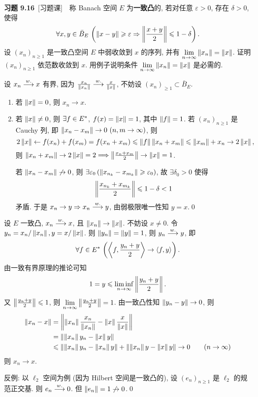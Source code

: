 	\textbf{习题 9.16}\ [习题课]\ \ 称 Banach 空间 $ E $ 为\textbf{一致凸}的, 若对任意 $ \varepsilon>0 $, 存在 $ \delta>0 $, 使得
	\[
		\forall x, y\in\bar{B}_{E}\,\left(\left\| x-y \right\|\geqslant\varepsilon\Rightarrow \left\| \frac{x+y}{2} \right\|\leqslant 1-\delta\right).
	\]
	设 $ (x_{n})_{n\geqslant1} $ 是一致凸空间 $ E $ 中弱收敛到 $ x $ 的序列, 并有 $ \lim\limits_{n\to\infty}\left\| x_{n} \right\|=\left\| x \right\| $. 证明 $ (x_{n})_{n\geqslant1} $ 依范数收敛到 $ x $. 用例子说明条件 $ \lim\limits_{n\to\infty}\left\| x_{n} \right\|=\left\| x \right\| $ 是必需的.
	\begin{Proof}
		设 $ x_{n}\overset{w.}{\longrightarrow} x $ 有界, 因为 $ \frac{x_{n}}{\left\| x_{n} \right\|}\overset{w.}{\longrightarrow}\frac{x}{\left\| x \right\|} $, 不妨设 $ (x_{n})_{\geqslant1}\subset\bar{B}_{E} $.
		\begin{enumerate}[(1)]
			\item 若 $ \left\| x \right\|=0 $, 则 $ x_{n}\to x $.
			\item 若 $ \left\| x \right\|\ne 0 $, 则 $ \exists f\in E^{*} $, $ f(x)=\left\| x \right\|=1 $, 其中 $ \left\| f \right\|=1 $. 若 $ (x_{n})_{n\geqslant1} $ 是 Cauchy 列, 即 $ \norm{x_{n}- x_{m}}\to 0\ (n, m\to\infty) $, 则
			\[
				2\left\| x \right\|\leftarrow f(x_{n})+f(x_{m})=f(x_{n}+x_{m})\leqslant\left\| f \right\|\left\| x_{n}+x_{m} \right\|\leqslant\left\| x_{m} \right\|+x_{n}\to 2\left\| x \right\|,
			\]
			则 $ \left\| x_{n}+x_{m} \right\|\to 2\left\| x \right\|=2\Longrightarrow \left\| \frac{x_{n}+x_{m}}{2} \right\|\to \left\| x \right\|=1 $.

			若 $ \left\| x_{n}-x_{m} \right\|\not\to 0 $, 则 $ \exists\varepsilon_{0}\,(\left\| x_{n_{k}}-x_{m_{k}} \right\|\geqslant\varepsilon_{0}) $, 故 $ \exists \delta_{0}>0 $ 使得
			\[
				\left\| \frac{x_{n_{k}}+x_{m_{k}}}{2} \right\|\leqslant1-\delta<1
			\]
			矛盾. 于是 $ x_{n}\to y\Rightarrow x_{n}\overset{w.}{\longrightarrow} y $, 由弱极限唯一性知 $ y=x $.\qed
		\end{enumerate}
	\end{Proof}
	\begin{Proof}[另证]
		设 $ E $ 一致凸, $ x_{n}\overset{w.}{\longrightarrow} x $, 且 $ \left\| x_{n} \right\|\to\left\| x \right\| $. 不妨设 $ x\ne 0 $. 令 $ y_{n}=x_{n}/\left\| x_{n} \right\|, y=x/\left\| x \right\| $. 则 $ \left\| y_{n} \right\|=\left\| y \right\|=1 $, 则 $ y_{n}\overset{w.}{\longrightarrow} y $, 即
		\[
			\forall f\in E^{*}\,\left( \left\langle f, \frac{y_{n}+y}{2} \right\rangle\to \left\langle f, y \right\rangle \right).
		\]
		由一致有界原理的推论可知
		\[
			1=y\leqslant\liminf_{n\to\infty}\left\| \frac{y_{n}+y}{2} \right\|.
		\]
		又 $ \left\| \frac{y_{n}+y}{2} \right\|\leqslant1 $, 则 $ \lim\limits_{n\to\infty}\left\| \frac{y_{n}+y}{2} \right\|=1 $. 由一致凸性知 $ \left\| y_{n}-y \right\|\to 0 $, 则
		\[
			\begin{aligned}
				\left\| x_{n}-x \right\| & = \left\| \left\| x_{n} \right\|\frac{x_{n}}{\left\| x_{n} \right\|}-\left\| x \right\|\frac{x}{\left\| x \right\|} \right\|\\
				& = \left\| \left\| x_{n} \right\|y_{n}-\left\| x \right\|y \right\|\\
				& \leqslant\left\| \left\| x_{n} \right\|y_{n}-\left\| x_{n} \right\|y \right\|+\left\| \left\| x_{n} \right\|y-\left\| x \right\|y \right\|\to 0\qquad (n\to\infty)
			\end{aligned}
		\]
		则 $ x_{n}\to x $.

		反例: 以 $ \ell_{2} $ 空间为例 (因为 Hilbert 空间是一致凸的), 设 $ (e_{n})_{n\geqslant1} $ 是 $ \ell_{2} $ 的规范正交基. 则 $ e_{n}\overset{w.}{\longrightarrow} 0 $. 但 $ \left\| e_{n} \right\|=1\not\to 0 $.\qed
	\end{Proof}

